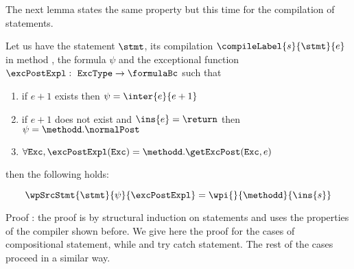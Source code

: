The next lemma states the same property but this time for the compilation of statements.
\begin{thm}\label{relWpStmt}
     Let us have the statement $\stmt$, its compilation $\compileLabel{s}{\stmt}{e}$  in  method \methodd, the formula $\psi$
     and the exceptional   function $\excPostExpl : \mbox{ \rm \texttt{ExcType}}  \rightarrow \formulaBc $ such that 

      \begin{enumerate}
            \item if $e+1$ exists  then $\psi = \inter{e}{e+1}$
	    \item if $e+1$ does not exist and $\ins{e} = \return$ then $\psi = \methodd. \normalPost$
	    \item $\forall \mbox{\rm\texttt{Exc}} ,  \excPostExpl( \mbox{\rm\texttt{Exc}} ) = \methodd.\getExcPost(\mbox{\rm\texttt{Exc}}, e ) $ 
      \end{enumerate} then the following holds: 
  
     $$   \wpSrcStmt{\stmt}{\psi }{\excPostExpl} = \wpi{}{\methodd}{\ins{s}}$$   
\end{thm}

Proof : the proof is  by structural induction on  statements  and uses the properties of the compiler 
        shown before. We give here the proof  for the cases of compositional statement, while and try catch statement.
The rest of the cases proceed in a similar way.


